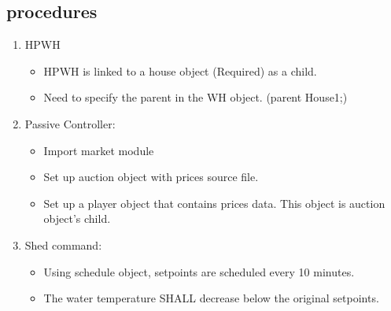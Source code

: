 \subsection{procedures}
    \begin{enumerate}
        \item HP\textunderscore WH
        \begin{itemize}
            \item HP\textunderscore WH is linked to a house object (Required) as a child.
            \item Need to specify the parent in the WH object. (parent House1;) 
        \end{itemize}
        \item Passive Controller:
        \begin{itemize}
            \item Import market module
            \item Set up auction object with prices source file.
            \item Set up a player object that contains prices data. This object is auction object's child.
        \end{itemize}
        \item Shed command:
        \begin{itemize}
            \item Using schedule object, setpoints are scheduled every 10 minutes.
            \item The water temperature SHALL decrease below the original setpoints. 
        \end{itemize}
    \end{enumerate}
